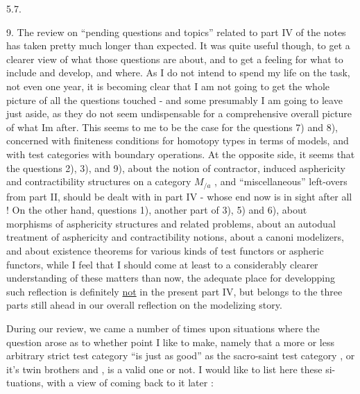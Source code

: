 
5.7.

9. The review on ``pending questions and topics'' related to part IV
of the notes has taken pretty much longer than expected. It was quite
useful though, to get a clearer view of what those questions are about,
and to get a feeling for what to include and develop, and where. As I
do not intend to spend my life on the task, not even one year, it is
becoming clear that I am not going to get the whole picture of all the
questions touched - and some presumably I am going to leave just
aside, as they do not seem undispensable for a comprehensive overall
picture of what Im after. This seems to me to be the case for the
questions 7) and 8), concerned with finiteness conditions for homotopy
types in terms of models, and  with test categories with
boundary operations. At the opposite side, it seems that the questions
2),  3), and 9), about the notion of contractor, induced asphericity
and contractibility structures on a category $M_{/a}$ , and ``miscellaneous''
left-overs from part II, should be dealt with in part IV - whose end
now is in sight after all ! On the other hand, questions 1), another
part of 3), 5) and  6), about morphisms of asphericity structures
and related problems, about an autodual treatment of asphericity and
contractibility notions, about a   canoni
modelizers, and about existence theorems for various kinds of test
functors or aspheric functors, while I feel that I should come  at
least to a considerably clearer understanding of these matters than now,
the adequate place for developping such reflection is definitely \uline{not} in
the present part IV, but belongs to  the three parts still ahead in our
overall reflection on the modelizing story.

During our review, we came a number of times upon situations where
the question arose as to whether   point I like to make, namely that
a more or less arbitrary \hand{(}strict\hand{)} test category\xout{,}  ``is just
as good'' as the sacro-saint test category \hand{$\Delta$}, or it's twin brothers
\hand{$\square$} and \hand{\unsure{$\bigcirc$}}, is a valid one or not. I would like to list here these si-%
tuations, with a view of coming back to it later :

